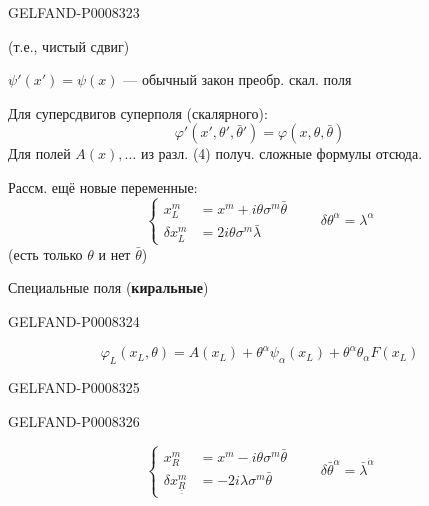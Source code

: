 \begin{GelfandAdjacentEvidence}{GELFAND-P000832}{3}


(т.е., чистый сдвиг)


\(\psi'(x')=\psi(x)\) — обычный закон преобр. скал. поля

Для суперсдвигов суперполя (скалярного):
\begin{equation*}
\varphi'(x',\theta',\bar\theta')=\varphi(x,\theta,\bar\theta)
\tag{8}
\end{equation*}
Для полей \(A(x),\ldots\) из разл. (4) получ. сложные формулы отсюда.

Рассм. ещё новые переменные:
\begin{equation*}
\left\{\begin{aligned}
x_L^m&=x^m+i\theta\sigma^m\bar\theta\\
\delta x_L^m&=2i\theta\sigma^m\bar\lambda
\end{aligned}\right.
\qquad\delta\theta^\alpha=\lambda^\alpha
\tag{9}
\end{equation*}
(есть только \(\theta\) и нет \(\bar\theta\))

Специальные поля (\textbf{киральные})
\end{GelfandAdjacentEvidence}
\begin{GelfandAdjacentEvidence}{GELFAND-P000832}{4}

\begin{equation*}
\varphi_L(x_L,\theta)=A(x_L)+\theta^\alpha\psi_\alpha(x_L)
+\theta^\alpha\theta_\alpha F(x_L)
\tag{10}
\end{equation*}
\end{GelfandAdjacentEvidence}
\begin{GelfandAdjacentEvidence}{GELFAND-P000832}{5}

\end{GelfandAdjacentEvidence}
\begin{GelfandAdjacentEvidence}{GELFAND-P000832}{6}

\begin{equation*}
\left\{\begin{aligned}
x_R^m&=x^m-i\theta\sigma^m\bar\theta\\
\delta x_{\underline{\underline R}}^m&=-2i\lambda\sigma^m\bar\theta
\end{aligned}\right.
\qquad\delta\bar\theta^{\dot\alpha}=\bar\lambda^{\dot\alpha}
\tag{11}
\end{equation*}
\end{GelfandAdjacentEvidence}



